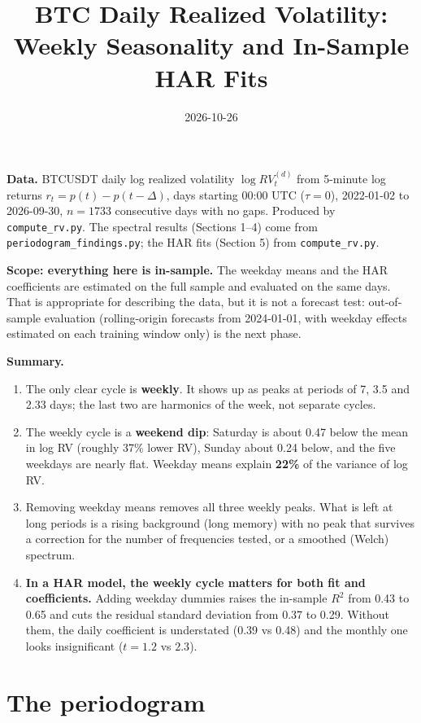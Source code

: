\documentclass[11pt]{article}
\title{BTC Daily Realized Volatility:\\ Weekly Seasonality and In-Sample HAR Fits}
\author{}
\date{2026-10-26}
\numberwithin{equation}{section}
\begin{document}
\maketitle

\noindent\textbf{Data.} BTCUSDT daily log realized volatility $\log RV_t^{(d)}$ from 5-minute log returns $r_t = p(t) - p(t-\Delta)$, days starting 00:00 UTC ($\tau = 0$), 2022-01-02 to 2026-09-30, $n = 1733$ consecutive days with no gaps. Produced by \texttt{compute\_rv.py}. The spectral results (Sections 1--4) come from \texttt{periodogram\_findings.py}; the HAR fits (Section 5) from \texttt{compute\_rv.py}.

\noindent\textbf{Scope: everything here is in-sample.} The weekday means and the HAR coefficients are estimated on the full sample and evaluated on the same days. That is appropriate for describing the data, but it is not a forecast test: out-of-sample evaluation (rolling-origin forecasts from 2024-01-01, with weekday effects estimated on each training window only) is the next phase.

\begin{TakeawayBox}
\textbf{Summary.}
\begin{enumerate}
\item The only clear cycle is \textbf{weekly}. It shows up as peaks at periods of 7, 3.5 and 2.33 days; the last two are harmonics of the week, not separate cycles.
\item The weekly cycle is a \textbf{weekend dip}: Saturday is about 0.47 below the mean in log RV (roughly 37\% lower RV), Sunday about 0.24 below, and the five weekdays are nearly flat. Weekday means explain \textbf{22\%} of the variance of log RV.
\item Removing weekday means removes all three weekly peaks. What is left at long periods is a rising background (long memory) with no peak that survives a correction for the number of frequencies tested, or a smoothed (Welch) spectrum.
\item \textbf{In a HAR model, the weekly cycle matters for both fit and coefficients.} Adding weekday dummies raises the in-sample $R^2$ from 0.43 to 0.65 and cuts the residual standard deviation from 0.37 to 0.29. Without them, the daily coefficient is understated (0.39 vs 0.48) and the monthly one looks insignificant ($t = 1.2$ vs $2.3$).
\end{enumerate}
\end{TakeawayBox}

\section{The periodogram}
\end{document}
